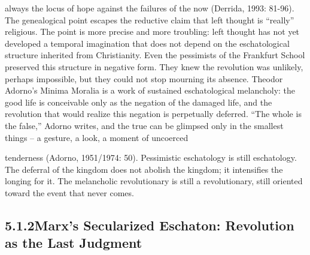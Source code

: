 always the locus of hope against the failures of the now (Derrida, 1993: 81-96). The genealogical point escapes the reductive claim that left thought is “really” religious. The point is more precise and more troubling: left thought has not yet developed a temporal imagination that does not depend on the eschatological structure inherited from Christianity. Even the pessimists of the Frankfurt School preserved this structure in negative form. They knew the revolution was unlikely, perhaps impossible, but they could not stop mourning its absence. Theodor Adorno’s Minima Moralia is a work of sustained eschatological melancholy: the good life is conceivable only as the negation of the damaged life, and the revolution that would realize this negation is perpetually deferred. “The whole is the false,” Adorno writes, and the true can be glimpsed only in the smallest things – a gesture, a look, a moment of uncoerced

tenderness (Adorno, 1951/1974: 50). Pessimistic eschatology is still eschatology. The deferral of the kingdom does not abolish the kingdom; it intensifies the longing for it. The melancholic revolutionary is still a revolutionary, still oriented toward the event that never comes.

\subsection{5.1.2\quad Marx’s Secularized Eschaton: Revolution as the Last Judgment}

